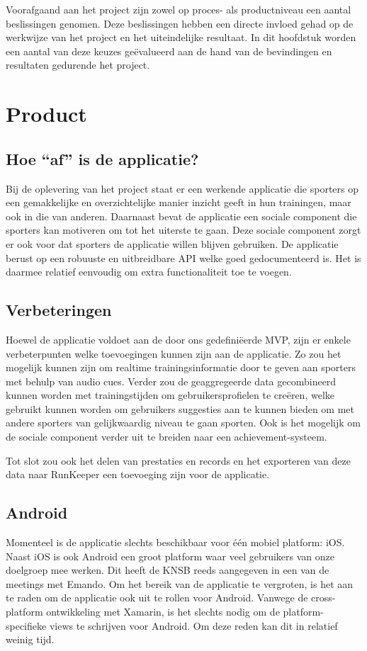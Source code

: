 Voorafgaand aan het project zijn zowel op proces- als productniveau een aantal beslissingen genomen. Deze beslissingen hebben een directe invloed gehad op de werkwijze van het project en het uiteindelijke resultaat. In dit hoofdstuk worden een aantal van deze keuzes geëvalueerd aan de hand van de bevindingen en resultaten gedurende het project. 

\section{Product}

\subsection{Hoe ``af'' is de applicatie?}
Bij de oplevering van het project staat er een werkende applicatie die sporters op een gemakkelijke en overzichtelijke manier inzicht geeft in hun trainingen, maar ook in die van anderen. Daarnaast bevat de applicatie een sociale component die sporters kan motiveren om tot het uiterste te gaan. Deze sociale component zorgt er ook voor dat sporters de applicatie willen blijven gebruiken. De applicatie berust op een robuuste en uitbreidbare API welke goed gedocumenteerd is. Het is daarmee relatief eenvoudig om extra functionaliteit toe te voegen.

\subsection{Verbeteringen}
Hoewel de applicatie voldoet aan de door ons gedefiniëerde MVP, zijn er enkele verbeterpunten welke toevoegingen kunnen zijn aan de applicatie. Zo zou het mogelijk kunnen zijn om realtime trainingsinformatie door te geven aan sporters met behulp van audio cues. 
Verder zou de geaggregeerde data gecombineerd kunnen worden met trainingstijden om gebruikersprofielen te creëren, welke gebruikt kunnen worden om gebruikers suggesties aan te kunnen bieden om met andere sporters van gelijkwaardig niveau te gaan sporten.
Ook is het mogelijk om de sociale component verder uit te breiden naar een achievement-systeem. 

Tot slot zou ook het delen van prestaties en records en het exporteren van deze data naar RunKeeper een toevoeging zijn voor de applicatie.

\subsection{Android}
Momenteel is de applicatie slechts beschikbaar voor één mobiel platform: iOS. Naast iOS is ook Android een groot platform waar veel gebruikers van onze doelgroep mee werken. Dit heeft de \ac{KNSB} reeds aangegeven in een van de meetings met Emando. Om het bereik van de applicatie te vergroten, is het aan te raden om de applicatie ook uit te rollen voor Android. Vanwege de cross-platform ontwikkeling met Xamarin, is het slechts nodig om de platform-specifieke views te schrijven voor Android. Om deze reden kan dit in relatief weinig tijd.

